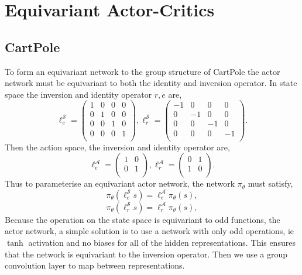 \section{Equivariant Actor-Critics}
\subsection{CartPole}

To form an equivariant network to the group structure of CartPole the actor network must be equivariant to both the identity and inversion operator. In state space the inversion and identity operator $r, e$ are,
\begin{equation}
	\ell^\mathcal{S}_e =
	\begin{pmatrix}
		1 & 0 & 0 & 0 \\
		0 & 1 & 0 & 0 \\
		0 & 0 & 1 & 0 \\
		0 & 0 & 0 & 1 \\
	\end{pmatrix},
	\ell^\mathcal{S}_r =
	\begin{pmatrix}
		-1 & 0  & 0  & 0  \\
		0  & -1 & 0  & 0  \\
		0  & 0  & -1 & 0  \\
		0  & 0  & 0  & -1 \\
	\end{pmatrix}.
\end{equation}
Then the action space, the inversion and identity operator are,
\begin{equation}
	\ell^\mathcal{A}_e =
	\begin{pmatrix}
		1 & 0 \\
		0 & 1 \\
	\end{pmatrix},
	\ell^\mathcal{A}_r =
	\begin{pmatrix}
		0 & 1 \\
		1 & 0 \\
	\end{pmatrix}.
\end{equation}
Thus to parameterise an equivariant actor network, the network $\pi_\theta$ must satisfy,
\begin{equation}
	\pi_\theta(\ell^\mathcal{S}_e s) = \ell^\mathcal{A}_e \pi_\theta(s),
\end{equation}
\begin{equation}
	\pi_\theta(\ell^\mathcal{S}_r s) = \ell^\mathcal{A}_r \pi_\theta(s),
\end{equation}
Because the operation on the state space is equivariant to odd functions, the actor network, a simple solution is to use a network with only odd operations, ie $\tanh$ activation and no biases for all of the hidden representations. This ensures that the network is equivariant to the inversion operator. Then we use a group convolution layer to map between representations.

